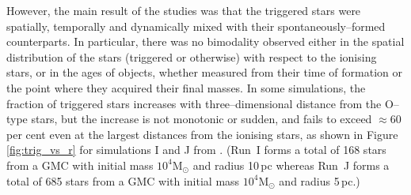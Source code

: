 \documentclass[useAMS,usenatbib,usegraphicx]{mn2e}
\begin{document}
\begin{figure*}
  \begin{center}
\setlength{\subfigcapskip}{10pt}
\hspace*{1cm} 
\caption[bf]{Fraction of stars which are triggered as a function of three--dimensional distance from the nearest ionising source in Runs I (left panel) and J (right panel) from \cite{Dale13b}.}
\label{fig:trig_vs_r}
  \end{center}
\end{figure*}

However, the main result of the \cite{Dale13b} studies was that the triggered stars were spatially, temporally and dynamically mixed with their spontaneously--formed counterparts. In particular, there was no bimodality observed either in the spatial distribution of the stars (triggered or otherwise) with respect to the ionising stars, or in the ages of objects, whether measured from their time of formation or the point where they acquired their final masses. In some simulations, the fraction of triggered stars increases with three--dimensional distance from the O--type stars, but the increase is not monotonic or sudden, and fails to exceed $\approx60$\,per cent even at the largest distances from the ionising stars, as shown in Figure \ref{fig:trig_vs_r} for simulations I and J from \cite{Dale13b}. (Run~I forms a total of 168 stars from a GMC with initial mass $10^4$M$_\odot$ and radius 10\,pc whereas Run~J forms a total of 685 stars from a GMC with initial mass $10^4$M$_\odot$ and radius 5\,pc.) 
\end{document}
